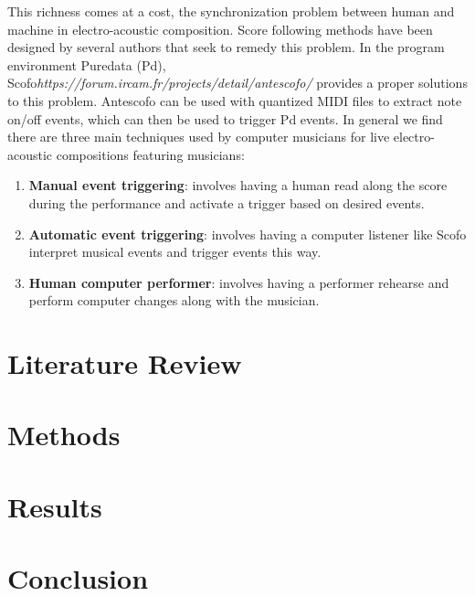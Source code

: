 This richness comes at a cost, the synchronization problem between human and machine in electro-acoustic composition. Score following methods have been designed by several authors that seek to remedy this problem. In the program environment Puredata (Pd), Scofo\textit{https://forum.ircam.fr/projects/detail/antescofo/} provides a proper solutions to this problem. Antescofo can be used with quantized MIDI files to extract note on/off events, which can then be used to trigger Pd events. In general we find there are three main techniques used by computer musicians for live electro-acoustic compositions featuring musicians:

\begin{enumerate}
    \item \textbf{Manual event triggering}: involves having a human read along the score during the performance and activate a trigger based on desired events.  
    \item \textbf{Automatic event triggering}: involves having a computer listener like Scofo interpret musical events and trigger events this way. 
    \item \textbf{Human computer performer}: involves having a performer rehearse and perform computer changes along with the musician. 
\end{enumerate}


\section{Literature Review} \label{sec:p1lr}


\section{Methods}

\section{Results}

\section{Conclusion}
